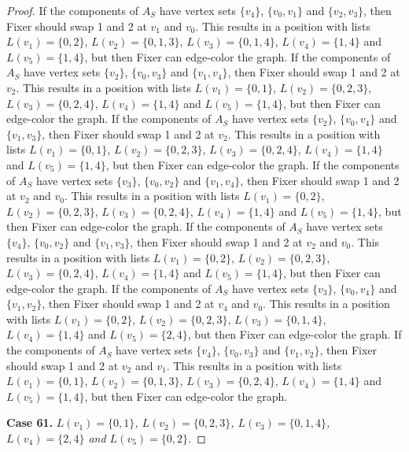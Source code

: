 \documentclass[12pt]{amsart}
\theoremstyle{plain}
\theoremstyle{definition}
\theoremstyle{remark}
\begin{document}
\begin{proof}
If the components of $A_S$ have vertex sets $\{v_4\}$, $\{v_0, v_1\}$ and $\{v_2, v_3\}$, then Fixer should swap 1 and 2 at $v_1$ and $v_0$. This results in a position with lists $L(v_1) = \{0, 2\}$, $L(v_2) = \{0, 1, 3\}$, $L(v_3) = \{0, 1, 4\}$, $L(v_4) = \{1, 4\}$ and $L(v_5) = \{1, 4\}$, but then Fixer can edge-color the graph.
If the components of $A_S$ have vertex sets $\{v_2\}$, $\{v_0, v_3\}$ and $\{v_1, v_4\}$, then Fixer should swap 1 and 2 at $v_2$. This results in a position with lists $L(v_1) = \{0, 1\}$, $L(v_2) = \{0, 2, 3\}$, $L(v_3) = \{0, 2, 4\}$, $L(v_4) = \{1, 4\}$ and $L(v_5) = \{1, 4\}$, but then Fixer can edge-color the graph.
If the components of $A_S$ have vertex sets $\{v_2\}$, $\{v_0, v_4\}$ and $\{v_1, v_3\}$, then Fixer should swap 1 and 2 at $v_2$. This results in a position with lists $L(v_1) = \{0, 1\}$, $L(v_2) = \{0, 2, 3\}$, $L(v_3) = \{0, 2, 4\}$, $L(v_4) = \{1, 4\}$ and $L(v_5) = \{1, 4\}$, but then Fixer can edge-color the graph.
If the components of $A_S$ have vertex sets $\{v_3\}$, $\{v_0, v_2\}$ and $\{v_1, v_4\}$, then Fixer should swap 1 and 2 at $v_2$ and $v_0$. This results in a position with lists $L(v_1) = \{0, 2\}$, $L(v_2) = \{0, 2, 3\}$, $L(v_3) = \{0, 2, 4\}$, $L(v_4) = \{1, 4\}$ and $L(v_5) = \{1, 4\}$, but then Fixer can edge-color the graph.
If the components of $A_S$ have vertex sets $\{v_4\}$, $\{v_0, v_2\}$ and $\{v_1, v_3\}$, then Fixer should swap 1 and 2 at $v_2$ and $v_0$. This results in a position with lists $L(v_1) = \{0, 2\}$, $L(v_2) = \{0, 2, 3\}$, $L(v_3) = \{0, 2, 4\}$, $L(v_4) = \{1, 4\}$ and $L(v_5) = \{1, 4\}$, but then Fixer can edge-color the graph.
If the components of $A_S$ have vertex sets $\{v_3\}$, $\{v_0, v_4\}$ and $\{v_1, v_2\}$, then Fixer should swap 1 and 2 at $v_4$ and $v_0$. This results in a position with lists $L(v_1) = \{0, 2\}$, $L(v_2) = \{0, 2, 3\}$, $L(v_3) = \{0, 1, 4\}$, $L(v_4) = \{1, 4\}$ and $L(v_5) = \{2, 4\}$, but then Fixer can edge-color the graph.
If the components of $A_S$ have vertex sets $\{v_4\}$, $\{v_0, v_3\}$ and $\{v_1, v_2\}$, then Fixer should swap 1 and 2 at $v_2$ and $v_1$. This results in a position with lists $L(v_1) = \{0, 1\}$, $L(v_2) = \{0, 1, 3\}$, $L(v_3) = \{0, 2, 4\}$, $L(v_4) = \{1, 4\}$ and $L(v_5) = \{1, 4\}$, but then Fixer can edge-color the graph.

\noindent\textbf{Case 61.  }\textit{$L(v_1) = \{0, 1\}$, $L(v_2) = \{0, 2, 3\}$, $L(v_3) = \{0, 1, 4\}$, $L(v_4) = \{2, 4\}$ and $L(v_5) = \{0, 2\}$.}


\end{proof}
\end{document}
